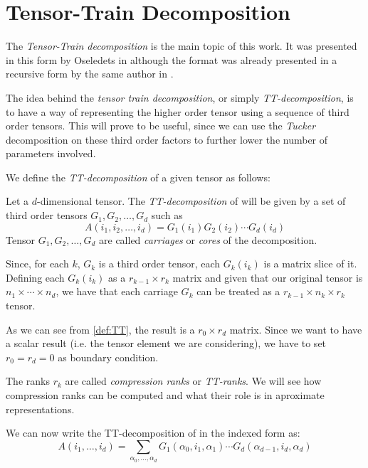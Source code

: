 \chapter{Tensor-Train Decomposition}

The \emph{Tensor-Train decomposition} is the main topic of this work. It was presented in this form by Oseledets in \cite{oseledets2011tt} although the format was already presented in a recursive form by the same author in \cite{oseledetstyrty2009}.

The idea behind the \emph{tensor train decomposition}, or simply \emph{TT-decomposition}, is to have a way of representing the higher order tensor using a sequence of third order tensors. This will prove to be useful, since we can use the \emph{Tucker} decomposition on these third order factors to further lower the number of parameters involved.

We define the \emph{TT-decomposition} of a given tensor \A as follows:

\begin{Def}
  Let \A a $d$-dimensional tensor. The \emph{TT-decomposition} of \A will be given by a set of third order tensors $G_1,G_2,\dots,G_d$ such as
  \begin{equation} \label{def:TT}
    A(i_1,i_2,\dots,i_d) = G_1(i_1)G_2(i_2)\cdots G_d(i_d)
  \end{equation}
  Tensor $G_1,G_2,\dots,G_d$ are called \emph{carriages} or \emph{cores} of the decomposition.
\end{Def}

Since, for each $k$, $G_k$ is a third order tensor, each $G_k(i_k)$ is a matrix slice of it. Defining each $G_k(i_k)$ as a $r_{k-1} \times r_k$ matrix and given that our original tensor \A is $n_1 \times \cdots \times n_d$, we have that each carriage $G_k$ can be treated as a $r_{k-1} \times n_k \times r_k$ tensor.

As we can see from \ref{def:TT}, the result is a $r_0 \times r_d$ matrix. Since we want to have a scalar result (i.e. the tensor element we are considering), we have to set $r_0 = r_d = 0$ as boundary condition.

The ranks $r_k$ are called \emph{compression ranks} or \emph{TT-ranks}. We will see how compression ranks can be computed and what their role is in aproximate representations.

We can now write the TT-decomposition of \A in the indexed form as:
\begin{equation} \label{def:TTindex}
  A(i_1,\dots,i_d) = \sum_{\alpha_0,\dots,\alpha_d} G_1(\alpha_0,i_1,\alpha_1) \cdots G_d(\alpha_{d-1},i_d,\alpha_d)
\end{equation}

